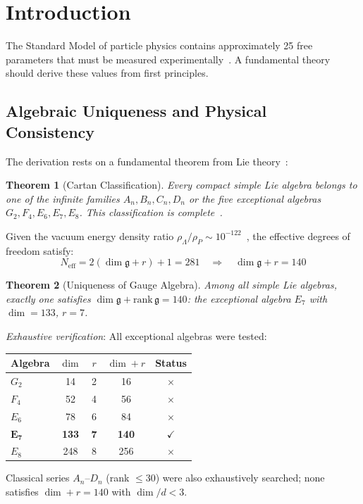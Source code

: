 \documentclass[11pt,a4paper]{article}
\newtheorem{theorem}{Theorem}
\begin{document}
\newpage

\section{Introduction}

The Standard Model of particle physics contains approximately 25 free parameters that must be measured experimentally~\cite{PDG2024}. A fundamental theory should derive these values from first principles.

\subsection{Algebraic Uniqueness and Physical Consistency}

The derivation rests on a fundamental theorem from Lie theory~\cite{Humphreys1972,Bourbaki2002}:

\begin{theorem}[Cartan Classification]
Every compact simple Lie algebra belongs to one of the infinite families $A_n, B_n, C_n, D_n$ or the five exceptional algebras $G_2, F_4, E_6, E_7, E_8$. This classification is complete~\cite{Humphreys1972}.
\end{theorem}

Given the vacuum energy density ratio $\rho_\Lambda/\rho_P \sim 10^{-122}$~\cite{Planck2018}, the effective degrees of freedom satisfy:
\begin{equation}
N_{\text{eff}} = 2(\dim\mathfrak{g} + r) + 1 = 281 \quad \Rightarrow \quad \dim\mathfrak{g} + r = 140
\end{equation}

\begin{theorem}[Uniqueness of Gauge Algebra]
Among all simple Lie algebras, exactly one satisfies $\dim\mathfrak{g} + \text{rank}\,\mathfrak{g} = 140$: the exceptional algebra $E_7$ with $\dim = 133$, $r = 7$.
\end{theorem}

\textit{Exhaustive verification}: All exceptional algebras were tested:
\begin{center}
\begin{tabular}{|l|c|c|c|c|}
\hline
\textbf{Algebra} & $\dim$ & $r$ & $\dim + r$ & \textbf{Status} \\
\hline
$G_2$ & 14 & 2 & 16 & $\times$ \\
$F_4$ & 52 & 4 & 56 & $\times$ \\
$E_6$ & 78 & 6 & 84 & $\times$ \\
$\mathbf{E_7}$ & \textbf{133} & \textbf{7} & \textbf{140} & $\checkmark$ \\
$E_8$ & 248 & 8 & 256 & $\times$ \\
\hline
\end{tabular}
\end{center}
Classical series $A_n$--$D_n$ (rank $\leq 30$) were also exhaustively searched; none satisfies $\dim + r = 140$ with $\dim/d < 3$.
\end{document}
